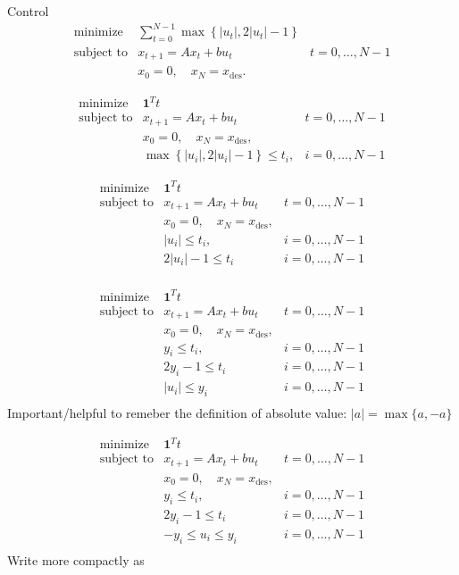 \begin{chapter}{Control}
    \[\begin{array}{lll}
        \text{minimize} \; & \sum_{t=0}^{N-1} \max \left\{ \left| u_t \right|, 2 \left| u_t \right| - 1 \right\} & \\
        \text{subject to} & x_{t+1} = Ax_t + bu_t \; & t=0, \ldots, N-1 \\
        & x_0 = 0, \quad x_{N} = x_{\text{des}}.
        \end{array}\]

    \[\begin{array}{lll}
        \text{minimize} \; & \bm{1}^T t & \\
        \text{subject to} & x_{t+1} = Ax_t + bu_t \; & t=0, \ldots, N-1 \\
        & x_0 = 0, \quad x_{N} = x_{\text{des}}, & \\
        & \max \left\{ \left| u_i \right|, 2 \left| u_i \right| - 1 \right\} \le t_i, & i = 0, \ldots, N-1
        \end{array}\]

    \[\begin{array}{lll}
        \text{minimize} \; & \bm{1}^T t & \\
        \text{subject to} & x_{t+1} = Ax_t + bu_t \; & t=0, \ldots, N-1 \\
        & x_0 = 0, \quad x_{N} = x_{\text{des}}, & \\
        & \left| u_i \right| \le t_i, & i = 0, \ldots, N-1 \\
        & 2 \left| u_i \right| - 1 \le t_i & i = 0, \ldots, N-1 \\
        \end{array}\]
    
    \[\begin{array}{lll}
    \text{minimize} \; & \bm{1}^T t & \\
    \text{subject to} & x_{t+1} = Ax_t + bu_t \; & t=0, \ldots, N-1 \\
    & x_0 = 0, \quad x_{N} = x_{\text{des}}, & \\
    & y_i \le t_i, & i = 0, \ldots, N-1 \\
    & 2 y_i - 1 \le t_i & i = 0, \ldots, N-1 \\
    & \left| u_i \right| \le y_i & i = 0, \ldots, N-1 \\
    \end{array}\]
    Important/helpful to remeber the definition of absolute value: $\left| a \right| = \max\{a, -a\}$

    \[\begin{array}{lll}
        \text{minimize} \; & \bm{1}^T t & \\
        \text{subject to} & x_{t+1} = Ax_t + bu_t \; & t=0, \ldots, N-1 \\
        & x_0 = 0, \quad x_{N} = x_{\text{des}}, & \\
        & y_i \le t_i, & i = 0, \ldots, N-1 \\
        & 2 y_i - 1 \le t_i & i = 0, \ldots, N-1 \\
        & -y_i \le u_i \le y_i & i = 0, \ldots, N-1 \\
        \end{array}\]
    Write more compactly as


\end{chapter}
